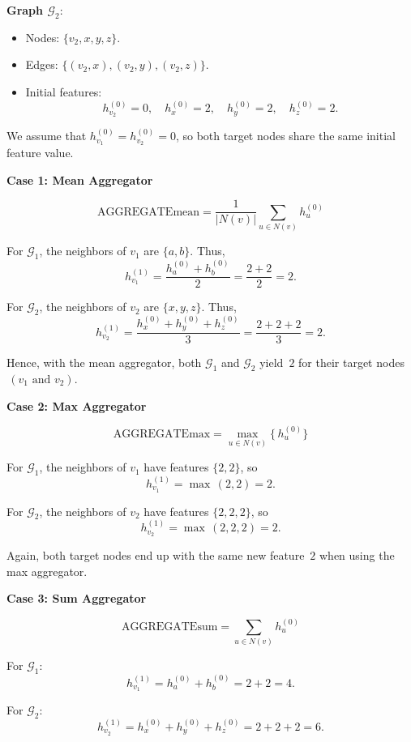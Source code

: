 \documentclass[a4paper,12pt]{article}
\begin{document}
\textbf{Graph \(\mathcal{G}_2\)}:
\begin{itemize}
    \item Nodes: \( \{v_2, x, y, z\} \).
    \item Edges: \(\{(v_2, x), (v_2, y), (v_2, z)\}\).
    \item Initial features:
    \[
    h^{(0)}_{v_2} = 0,\quad h^{(0)}_{x} = 2,\quad h^{(0)}_{y} = 2,\quad h^{(0)}_{z} = 2.
    \]
\end{itemize}

We assume that \(h^{(0)}_{v_1} = h^{(0)}_{v_2} = 0\), so both target nodes share 
the same initial feature value.

\bigskip

\textbf{Case 1: Mean Aggregator}

\[
\text{AGGREGATEmean} = \frac{1}{|N(v)|}\sum_{u \in N(v)}h^{(0)}_u
\]

For \(\mathcal{G}_1\), the neighbors of \(v_1\) are \(\{a, b\}\). Thus,
\[
h^{(1)}_{v_1} = \frac{h^{(0)}_a + h^{(0)}_b}{2} = \frac{2 + 2}{2} = 2.
\]

For \(\mathcal{G}_2\), the neighbors of \(v_2\) are \(\{x, y, z\}\). Thus,
\[
h^{(1)}_{v_2} = \frac{h^{(0)}_x + h^{(0)}_y + h^{(0)}_z}{3} 
= \frac{2 + 2 + 2}{3} = 2.
\]

Hence, with the mean aggregator, both \(\mathcal{G}_1\) and \(\mathcal{G}_2\) yield 
\(\,2\) for their target nodes \(\,(v_1 \text{ and } v_2)\).

\bigskip

\textbf{Case 2: Max Aggregator}

\[
\text{AGGREGATEmax} = \max_{u \in N(v)} \{\,h^{(0)}_u\}
\]

For \(\mathcal{G}_1\), the neighbors of \(v_1\) have features \(\{2, 2\}\), 
so
\[
h^{(1)}_{v_1} = \max\,(2, 2) = 2.
\]

For \(\mathcal{G}_2\), the neighbors of \(v_2\) have features \(\{2, 2, 2\}\), 
so
\[
h^{(1)}_{v_2} = \max\,(2, 2, 2) = 2.
\]

Again, both target nodes end up with the same new feature \(\,2\) when using 
the max aggregator.

\bigskip

\textbf{Case 3: Sum Aggregator}

\[
\text{AGGREGATEsum} = \sum_{u \in N(v)} h^{(0)}_u
\]

For \(\mathcal{G}_1\):
\[
h^{(1)}_{v_1} = h^{(0)}_a + h^{(0)}_b = 2 + 2 = 4.
\]

For \(\mathcal{G}_2\):
\[
h^{(1)}_{v_2} = h^{(0)}_x + h^{(0)}_y + h^{(0)}_z = 2 + 2 + 2 = 6.
\]
\end{document}

